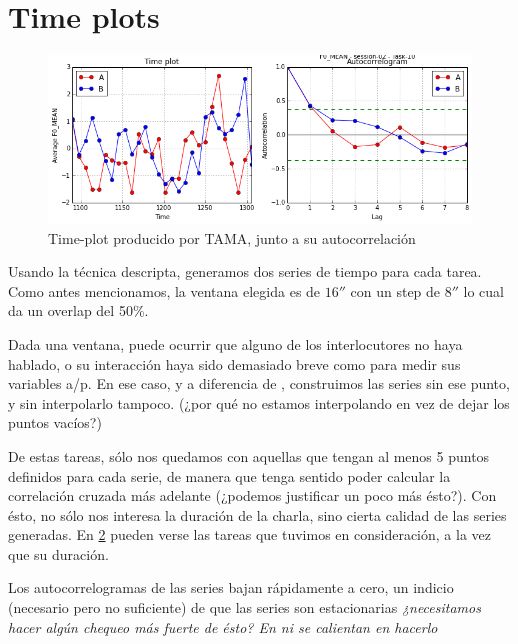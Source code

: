 \section{Time plots}

\begin{figure}
\centering
\includegraphics[width=15cm]{images/time_plot_with_autocorrelation.png}
\caption{Time-plot producido por TAMA, junto a su autocorrelación \label{time_plot}}

\end{figure}

Usando la técnica descripta, generamos dos series de tiempo para cada tarea. Como antes mencionamos, la ventana elegida es de $16''$ con un step de $8''$ lo cual da un overlap del 50\%.

Dada una ventana, puede ocurrir que alguno de los interlocutores no haya hablado, o su interacción haya sido demasiado breve como para medir sus variables a/p. En ese caso, y a diferencia de \cite{KOU2008}, construimos las series sin ese punto, y sin interpolarlo tampoco. (¿por qué no estamos interpolando en vez de dejar los puntos vacíos?)

De estas tareas, sólo nos quedamos con aquellas que tengan al menos 5 puntos definidos para cada serie, de manera que tenga sentido poder calcular la correlación cruzada más adelante (¿podemos justificar un poco más ésto?). Con ésto, no sólo nos interesa la duración de la charla, sino cierta calidad de las series generadas. En \ref{time_series_table} pueden verse las tareas que tuvimos en consideración, a la vez que su duración.

\begin{figure}
\centering


\label{time_series_table}
\end{figure}

Los autocorrelogramas de las series bajan rápidamente a cero, un indicio (necesario pero no suficiente) de que las series son estacionarias \emph{¿necesitamos hacer algún chequeo más fuerte de ésto? En \cite{KOU2009} ni se calientan en hacerlo}

